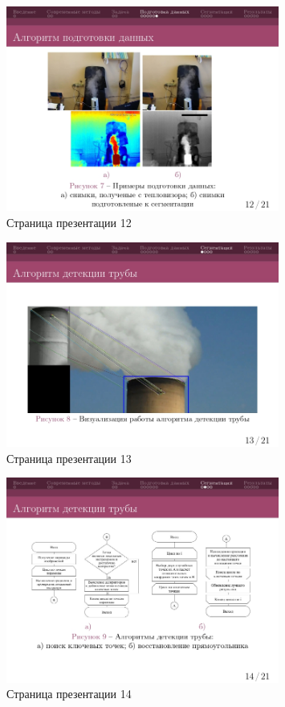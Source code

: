 \documentclass[14pt, a4paper]{extreport}
\begin{document}
	\begin{figure}[h!]
		\centering
		\includegraphics[width = 0.8\textwidth]{image/процентовка1_page-0012}	
		\caption{Страница презентации 12}
	\end{figure}
	\begin{figure}[h!]
		\centering
		\includegraphics[width = 0.8\textwidth]{image/процентовка1_page-0013}	
		\caption{Страница презентации 13}
	\end{figure}
	\begin{figure}[h!]
		\centering
		\includegraphics[width = 0.8\textwidth]{image/процентовка1_page-0014}	
		\caption{Страница презентации 14}
	\end{figure}
\end{document}
